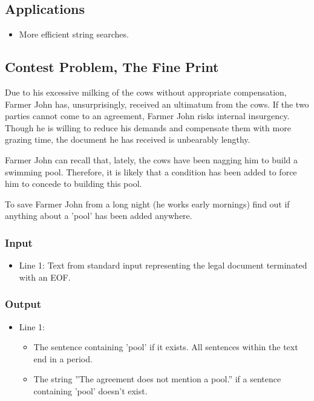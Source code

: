 \subsection{Applications}
\begin{itemize}
	\item More efficient string searches.
\end{itemize}

\subsection{Contest Problem, The Fine Print}
Due to his excessive milking of the cows without appropriate compensation, Farmer John has, unsurprisingly, received an ultimatum from the cows.
If the two parties cannot come to an agreement, Farmer John risks internal insurgency.
Though he is willing to reduce his demands and compensate them with more grazing time, the document he has received is unbearably lengthy.

Farmer John can recall that, lately, the cows have been nagging him to build a swimming pool.
Therefore, it is likely that a condition has been added to force him to concede to building this pool.

To save Farmer John from a long night (he works early mornings) find out if anything about a 'pool' has been added anywhere.

\subsubsection{Input}
\begin{itemize}
	\item Line 1: Text from standard input representing the legal document terminated with an EOF.
\end{itemize}


\subsubsection{Output}
\begin{itemize}
	\item Line 1:
	\begin{itemize}
		\item The sentence containing 'pool' if it exists. All sentences within the text end in a period.
		\item The string ''The agreement does not mention a pool.'' if a sentence containing 'pool' doesn't exist.
	\end{itemize}
\end{itemize}


